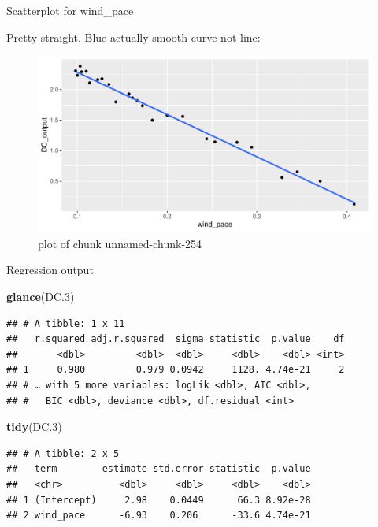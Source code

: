 \documentclass[ignorenonframetext,]{beamer}
\newenvironment{Shaded}{\begin{snugshade}}{\end{snugshade}}
\newcommand{\FloatTok}[1]{\textcolor[rgb]{0.00,0.00,0.81}{#1}}
\newcommand{\KeywordTok}[1]{\textcolor[rgb]{0.13,0.29,0.53}{\textbf{#1}}}
\newcommand{\NormalTok}[1]{#1}
\begin{document}
\begin{frame}{Scatterplot for wind\_pace}
\protect\hypertarget{scatterplot-for-wind_pace}{}

Pretty straight. Blue actually smooth curve not line:

\begin{figure}
\centering
\includegraphics{figure/unnamed-chunk-254-1.pdf}
\caption{plot of chunk unnamed-chunk-254}
\end{figure}

\end{frame}

\begin{frame}[fragile]{Regression output}
\protect\hypertarget{regression-output}{}

\begin{Shaded}
\begin{Highlighting}[]
\KeywordTok{glance}\NormalTok{(DC}\FloatTok{.3}\NormalTok{)}
\end{Highlighting}
\end{Shaded}

\begin{verbatim}
## # A tibble: 1 x 11
##   r.squared adj.r.squared  sigma statistic  p.value    df
##       <dbl>         <dbl>  <dbl>     <dbl>    <dbl> <int>
## 1     0.980         0.979 0.0942     1128. 4.74e-21     2
## # … with 5 more variables: logLik <dbl>, AIC <dbl>,
## #   BIC <dbl>, deviance <dbl>, df.residual <int>
\end{verbatim}

\begin{Shaded}
\begin{Highlighting}[]
\KeywordTok{tidy}\NormalTok{(DC}\FloatTok{.3}\NormalTok{)}
\end{Highlighting}
\end{Shaded}

\begin{verbatim}
## # A tibble: 2 x 5
##   term        estimate std.error statistic  p.value
##   <chr>          <dbl>     <dbl>     <dbl>    <dbl>
## 1 (Intercept)     2.98    0.0449      66.3 8.92e-28
## 2 wind_pace      -6.93    0.206      -33.6 4.74e-21
\end{verbatim}

\end{frame}
\end{document}
